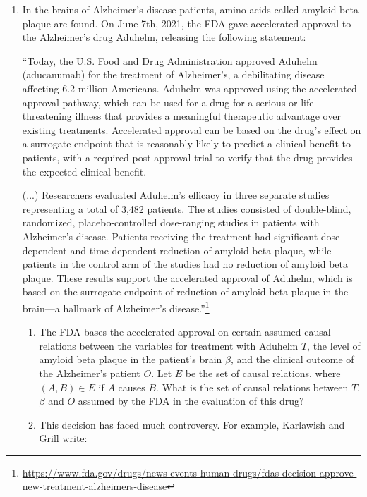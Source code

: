 \begin{enumerate}[label=1.\arabic*]
    \begin{ungradedsolution}
        Many correct answers exist.
    \end{ungradedsolution}


    \item %
    In the brains of Alzheimer's disease patients, amino acids called amyloid beta plaque are found. On June 7th, 2021, the FDA gave accelerated approval to the Alzheimer's drug Aduhelm, releasing the following statement:

    ``Today, the U.S. Food and Drug Administration approved Aduhelm (aducanumab) for the treatment of Alzheimer's, a debilitating disease affecting 6.2 million Americans. Aduhelm was approved using the accelerated approval pathway, which can be used for a drug for a serious or life-threatening illness that provides a meaningful therapeutic advantage over existing treatments. Accelerated approval can be based on the drug's effect on a surrogate endpoint that is reasonably likely to predict a clinical benefit to patients, with a required post-approval trial to verify that the drug provides the expected clinical benefit.

    (...) Researchers evaluated Aduhelm's efficacy in three separate studies representing a total of 3,482 patients. The studies consisted of double-blind, randomized, placebo-controlled dose-ranging studies in patients with Alzheimer's disease. Patients receiving the treatment had significant dose-dependent and time-dependent reduction of amyloid beta plaque, while patients in the control arm of the studies had no reduction of amyloid beta plaque. These results support the accelerated approval of Aduhelm, which is based on the surrogate endpoint of reduction of amyloid beta plaque in the brain---a hallmark of Alzheimer's disease.''\footnote{\url{https://www.fda.gov/drugs/news-events-human-drugs/fdas-decision-approve-new-treatment-alzheimers-disease}}
    \begin{enumerate}
        \item The FDA bases the accelerated approval on certain assumed causal relations between the variables for treatment with Aduhelm $T$, the level of amyloid beta plaque in the patient's brain $\beta$, and the clinical outcome of the Alzheimer's patient $O$. Let $E$ be the set of causal relations, where $(A,B) \in E$ if $A$ causes $B$. What is the set of causal relations between $T$, $\beta$ and $O$ assumed by the FDA in the evaluation of this drug?
        \item This decision has faced much controversy. For example, Karlawish and Grill write:


\end{enumerate}
\end{enumerate}
